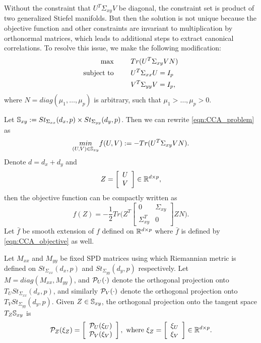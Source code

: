 \documentclass[11pt,a4paper]{article}
\begin{document}
Without the constraint that $U^T\Sigma_{xy}V$ be diagonal, the constraint set is product of two generalized Stiefel manifolds. But then the solution is not unique because the objective function and other constraints are invariant to multiplication by orthonormal matrices, which leads to additional steps to extract canonical correlations. To resolve this issue, we make the following modification:
\begin{alignat}{3}
{\text{max}}& &&Tr(U^T\Sigma_{xy}VN) \nonumber\\
\text{subject to}&\hspace{0.5cm} &&U^T\Sigma_{xx}U = I_p \nonumber\\
& &&V^T\Sigma_{yy}V = I_p,\label{eqn:CCA_problem}
\end{alignat}
where $N = diag(\mu_1,\ldots,\mu_p)$ is arbitrary, such that $\mu_1>\ldots,\mu_p>0$.

Let $\mathbb{S}_{xy}:= St_{\Sigma_{xx}}(d_x,p)\times St_{\Sigma_{yy}}(d_y,p)$. Then we can rewrite \eqref{eqn:CCA_problem} as 
\begin{equation}
\underset{(U,V)\in\mathbb{S}_{xy}}{min} f(U,V) := -Tr(U^T\Sigma_{xy}VN).\label{eqn:Riemannian_CCA_problem}
\end{equation}
Denote $d = d_x+d_y$ and 
\begin{equation*}
    Z = \left[\begin{array}{c}U\\V\end{array}\right]\in\mathbb{R}^{d\times p},
\end{equation*}
then the objective function can be compactly written as 
\begin{equation}
    f(Z) = -\dfrac{1}{2} Tr\Bigg(Z^T
    \left[\begin{array}{cc}
        0 & \Sigma_{xy} \\
        \Sigma_{xy}^T & 0
    \end{array}\right]ZN
    \Bigg).\label{eqn:CCA_objective}
\end{equation}
Let $\bar{f}$ be smooth extension of $f$ defined on $\mathbb{R}^{d\times p}$ where $\bar{f}$ is defined by \eqref{eqn:CCA_objective} as well. 

Let $M_{xx}$ and $M_{yy}$ be fixed SPD matrices using which Riemannian metric is defined on $St_{\Sigma_{xx}}(d_x,p)$ and $St_{\Sigma_{yy}}(d_y,p)$ respectively. Let $M = diag(M_{xx},M_{yy})$, and $\mathcal{P}_U(\cdot)$ denote the orthogonal projection onto $T_USt_{\Sigma_{xx}}(d_x,p)$, and similarly $\mathcal{P}_V(\cdot)$ denote the orthogonal projection onto $T_VSt_{\Sigma_{yy}}(d_y,p)$. Given $Z\in\mathbb{S}_{xy}$, the orthogonal projection onto the tangent space $T_Z\mathbb{S}_{xy}$ is
\begin{equation*}
\mathcal{P}_Z(\xi_Z) = \left[\begin{array}{c}\mathcal{P}_U(\xi_U)\\\mathcal{P}_V(\xi_V)\end{array}\right], \text{ where } \xi_Z = \left[\begin{array}{c}\xi_U\\\xi_V\end{array}\right]\in\mathbb{R}^{d\times p}.
\end{equation*}
\end{document}
